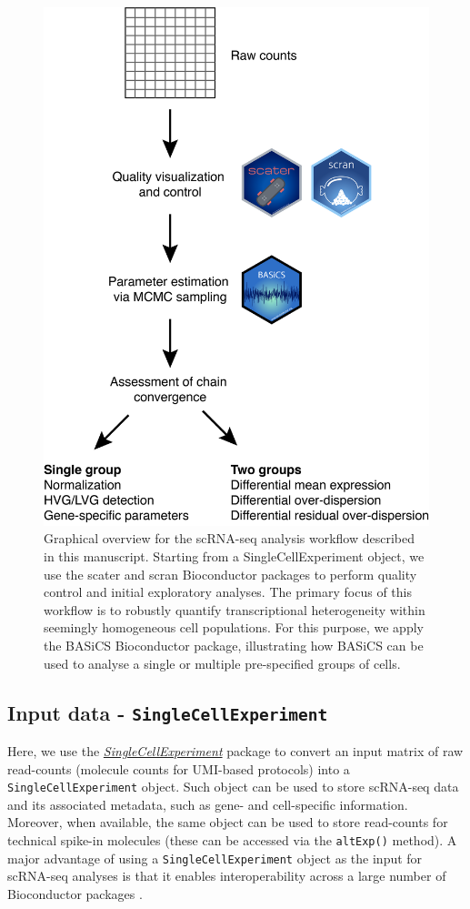 \documentclass[9pt,a4paper,]{extarticle}
\begin{document}
\begin{figure}[h]

{\centering \includegraphics[width=0.5\linewidth]{figure/Overview} 

}

\caption{Graphical overview for the scRNA-seq analysis workflow described in this manuscript. Starting from a SingleCellExperiment object, we use the scater and scran Bioconductor packages to perform quality control and initial exploratory analyses. The primary focus of this workflow is to robustly quantify transcriptional heterogeneity within seemingly homogeneous cell populations. For this purpose, we apply the BASiCS Bioconductor package, illustrating how BASiCS can be used to analyse a single or multiple pre-specified groups of cells.}\label{fig:overview}
\end{figure}

\hypertarget{input-data---singlecellexperiment}{%
\subsection{\texorpdfstring{Input data - \texttt{SingleCellExperiment}}{Input data - SingleCellExperiment}}\label{input-data---singlecellexperiment}}

Here, we use the \emph{\href{https://bioconductor.org/packages/3.11/SingleCellExperiment}{SingleCellExperiment}} package to convert an input
matrix of raw read-counts (molecule counts for UMI-based protocols) into a
\texttt{SingleCellExperiment} object.
Such object can be used to store scRNA-seq data and its associated metadata,
such as gene- and cell-specific information.
Moreover, when available, the same object can be used to store read-counts for
technical spike-in molecules (these can be accessed via the \texttt{altExp()} method).
A major advantage of using a \texttt{SingleCellExperiment} object as the input for
scRNA-seq analyses is that it enables interoperability across a large number of
Bioconductor packages \citep{Amezquita2019}.
\end{document}
